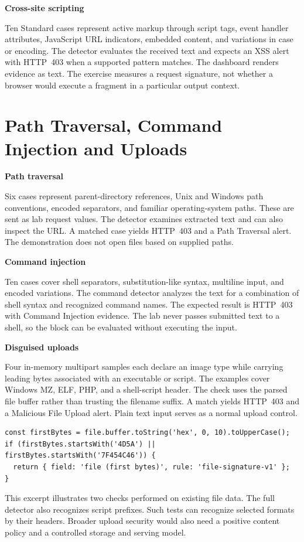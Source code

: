 \documentclass[11pt,a4paper,oneside]{report}
\newcommand{\topic}[1]{\smallskip\noindent\textbf{#1}\par\nobreak\vspace{-.39em}}
\newcommand{\sheet}[1]{\clearpage\section{#1}}
\begin{document}
\topic{Cross-site scripting}
Ten Standard cases represent active markup through script tags, event handler attributes, JavaScript URL indicators, embedded content, and variations in case or encoding. The detector evaluates the received text and expects an XSS alert with HTTP~403 when a supported pattern matches. The dashboard renders evidence as text. The exercise measures a request signature, not whether a browser would execute a fragment in a particular output context.

\sheet{Path Traversal, Command Injection and Uploads}
\topic{Path traversal}
Six cases represent parent-directory references, Unix and Windows path conventions, encoded separators, and familiar operating-system paths. These are sent as lab request values. The detector examines extracted text and can also inspect the URL. A matched case yields HTTP~403 and a Path Traversal alert. The demonstration does not open files based on supplied paths.

\topic{Command injection}
Ten cases cover shell separators, substitution-like syntax, multiline input, and encoded variations. The command detector analyzes the text for a combination of shell syntax and recognized command names. The expected result is HTTP~403 with Command Injection evidence. The lab never passes submitted text to a shell, so the block can be evaluated without executing the input.

\topic{Disguised uploads}
Four in-memory multipart samples each declare an image type while carrying leading bytes associated with an executable or script. The examples cover Windows MZ, ELF, PHP, and a shell-script header. The check uses the parsed file buffer rather than trusting the filename suffix. A match yields HTTP~403 and a Malicious File Upload alert. Plain text input serves as a normal upload control.

\begin{lstlisting}[caption={Illustrative leading-byte gate based on the upload detector}]
const firstBytes = file.buffer.toString('hex', 0, 10).toUpperCase();
if (firstBytes.startsWith('4D5A') || firstBytes.startsWith('7F454C46')) {
  return { field: 'file (first bytes)', rule: 'file-signature-v1' };
}
\end{lstlisting}

This excerpt illustrates two checks performed on existing file data. The full detector also recognizes script prefixes. Such tests can recognize selected formats by their headers. Broader upload security would also need a positive content policy and a controlled storage and serving model.
\end{document}
